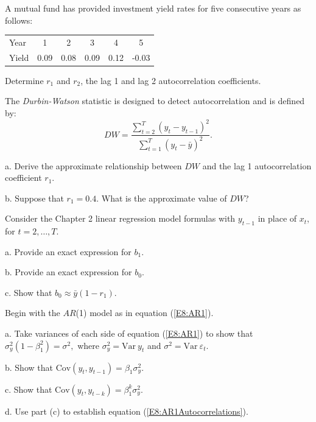 \begin{exercises}

\item A mutual fund has provided investment yield rates for five consecutive years as follows:
\begin{center}
\begin{tabular}{lccccc}
  \hline
 Year & 1 & 2 & 3 & 4 & 5 \\
Yield & 0.09 & 0.08 & 0.09 & 0.12 & -0.03 \\
  \hline
\end{tabular}\end{center}

Determine $r_1$ and $r_2$, the lag 1 and lag 2 autocorrelation
coefficients.

\item The \textit{Durbin-Watson} statistic is designed to detect autocorrelation and is defined by:
\begin{equation*}
DW = \frac {\sum_{t=2}^T (y_t - y_{t-1})^2} {\sum_{t=1}^T (y_t -
\bar{y})^2}.
\end{equation*}


a. Derive the approximate relationship between $DW$ and the lag 1
autocorrelation coefficient $r_1$.

b. Suppose that $r_1 = 0.4$. What is the approximate value of $DW$?



\item Consider the Chapter 2 linear regression model formulas with
$y_{t-1}$ in place of $x_t$, for $t=2, \ldots, T$.

a. Provide an exact expression for $b_1$.

b. Provide an exact expression for $b_0$.

c. Show that $b_0 \approx \bar{y} (1-r_1) $.

\item Begin with the $AR$(1) model as in equation (\ref{E8:AR1}).

a. Take variances of each side of equation (\ref{E8:AR1}) to show
that $\sigma_y^2(1-\beta_1^2) = \sigma^2,$ where $\sigma_y^2 =
\mathrm{Var}~y_t$ and $\sigma^2 = \mathrm{Var}~\varepsilon_t$.

b. Show that $\mathrm{Cov}(y_t,y_{t-1}) = \beta_1 \sigma_y^2.$

c. Show that $\mathrm{Cov}(y_t,y_{t-k}) = \beta_1^k \sigma_y^2.$

d. Use part (c) to establish equation
(\ref{E8:AR1Autocorrelations}).


\end{exercises}
